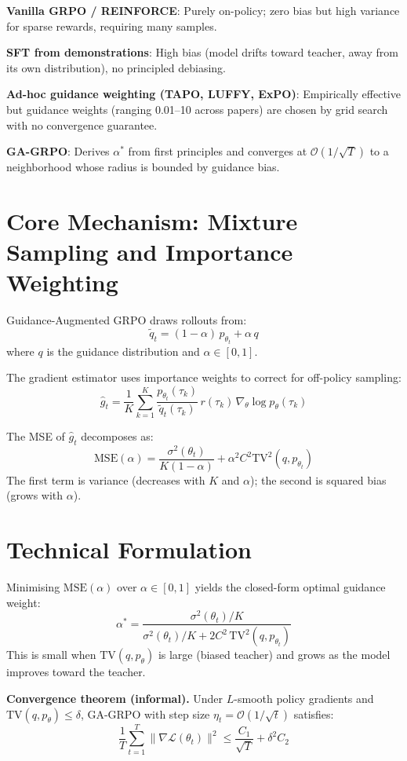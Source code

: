 \documentclass[10pt,twocolumn]{article}
\begin{document}
\textbf{Vanilla GRPO / REINFORCE}: Purely on-policy; zero bias but high variance
for sparse rewards, requiring many samples.

\textbf{SFT from demonstrations}: High bias (model drifts toward teacher, away
from its own distribution), no principled debiasing.

\textbf{Ad-hoc guidance weighting (TAPO, LUFFY, ExPO)}: Empirically effective
but guidance weights (ranging 0.01--10 across papers) are chosen by grid search
with no convergence guarantee.

\textbf{GA-GRPO}: Derives $\alpha^*$ from first principles and converges at
$\mathcal{O}(1/\sqrt{T})$ to a neighborhood whose radius is bounded by
guidance bias.

\section{Core Mechanism: Mixture Sampling and Importance Weighting}

Guidance-Augmented GRPO draws rollouts from:
\[
\tilde{q}_t = (1-\alpha)\,p_{\theta_t} + \alpha\,q
\]
where $q$ is the guidance distribution and $\alpha \in [0,1]$.

The gradient estimator uses importance weights to correct for off-policy
sampling:
\[
\hat{g}_t = \frac{1}{K}\sum_{k=1}^K
  \frac{p_{\theta_t}(\tau_k)}{\tilde{q}_t(\tau_k)}\,
  r(\tau_k)\,\nabla_\theta\log p_\theta(\tau_k)
\]

The MSE of $\hat{g}_t$ decomposes as:
\[
\mathrm{MSE}(\alpha)
  = \frac{\sigma^2(\theta_t)}{K(1-\alpha)}
  + \alpha^2 C^2 \mathrm{TV}^2(q, p_{\theta_t})
\]
The first term is variance (decreases with $K$ and $\alpha$); the second is
squared bias (grows with $\alpha$).

\section{Technical Formulation}

Minimising $\mathrm{MSE}(\alpha)$ over $\alpha \in [0,1]$ yields the
closed-form optimal guidance weight:
\[
\alpha^* = \frac{\sigma^2(\theta_t)/K}
               {\sigma^2(\theta_t)/K + 2C^2\,\mathrm{TV}^2(q,p_{\theta_t})}
\]
This is small when $\mathrm{TV}(q,p_\theta)$ is large (biased teacher) and
grows as the model improves toward the teacher.

\textbf{Convergence theorem (informal).} Under $L$-smooth policy gradients
and $\mathrm{TV}(q,p_\theta)\leq\delta$, GA-GRPO with step size
$\eta_t = \mathcal{O}(1/\sqrt{t})$ satisfies:
\[
\frac{1}{T}\sum_{t=1}^T\|\nabla\mathcal{L}(\theta_t)\|^2
  \leq \frac{C_1}{\sqrt{T}} + \delta^2 C_2
\]
\end{document}
